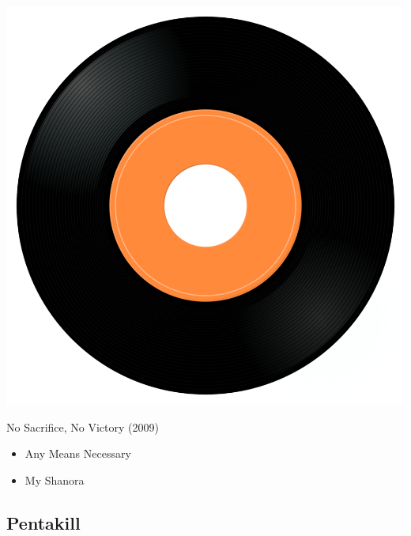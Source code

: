 \begin{minipage}[t]{0.25\textwidth}
\captionsetup{type=figure}
\includegraphics[width=\textwidth]{Images/cover.png}
\caption*{No Sacrifice, No Victory (2009)}
\end{minipage}
\begin{minipage}[t]{0.25\textwidth}\vspace{0pt}
\begin{itemize}[nosep,leftmargin=1em,labelwidth=*,align=left]
	\setlength{\itemsep}{0pt}
	\item Any Means Necessary
	\item My Shanora
\end{itemize}
\end{minipage}

\subsection{Pentakill}

